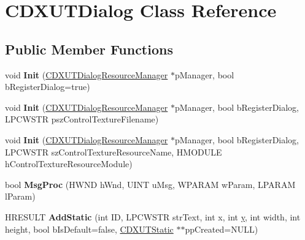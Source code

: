 \hypertarget{class_c_d_x_u_t_dialog}{\section{C\+D\+X\+U\+T\+Dialog Class Reference}
\label{class_c_d_x_u_t_dialog}
}
\subsection*{Public Member Functions}
\begin{DoxyCompactItemize}
\item 
\hypertarget{class_c_d_x_u_t_dialog_a45fcf9a802d8a9f1bce9bded09c58e22}{void {\bfseries Init} (\hyperlink{class_c_d_x_u_t_dialog_resource_manager}{C\+D\+X\+U\+T\+Dialog\+Resource\+Manager} $\ast$p\+Manager, bool b\+Register\+Dialog=true)}\label{class_c_d_x_u_t_dialog_a45fcf9a802d8a9f1bce9bded09c58e22}

\item 
\hypertarget{class_c_d_x_u_t_dialog_a50607e82b3211003dfaf0daf79aa0719}{void {\bfseries Init} (\hyperlink{class_c_d_x_u_t_dialog_resource_manager}{C\+D\+X\+U\+T\+Dialog\+Resource\+Manager} $\ast$p\+Manager, bool b\+Register\+Dialog, L\+P\+C\+W\+S\+T\+R psz\+Control\+Texture\+Filename)}\label{class_c_d_x_u_t_dialog_a50607e82b3211003dfaf0daf79aa0719}

\item 
\hypertarget{class_c_d_x_u_t_dialog_aa1de5939c452894caa2602505aa77e72}{void {\bfseries Init} (\hyperlink{class_c_d_x_u_t_dialog_resource_manager}{C\+D\+X\+U\+T\+Dialog\+Resource\+Manager} $\ast$p\+Manager, bool b\+Register\+Dialog, L\+P\+C\+W\+S\+T\+R sz\+Control\+Texture\+Resource\+Name, H\+M\+O\+D\+U\+L\+E h\+Control\+Texture\+Resource\+Module)}\label{class_c_d_x_u_t_dialog_aa1de5939c452894caa2602505aa77e72}

\item 
\hypertarget{class_c_d_x_u_t_dialog_abb1e03c6d2da865384e34a6a60a41be4}{bool {\bfseries Msg\+Proc} (H\+W\+N\+D h\+Wnd, U\+I\+N\+T u\+Msg, W\+P\+A\+R\+A\+M w\+Param, L\+P\+A\+R\+A\+M l\+Param)}\label{class_c_d_x_u_t_dialog_abb1e03c6d2da865384e34a6a60a41be4}

\item 
\hypertarget{class_c_d_x_u_t_dialog_afe893ab17f6905d1908e6fd1499749b1}{H\+R\+E\+S\+U\+L\+T {\bfseries Add\+Static} (int I\+D, L\+P\+C\+W\+S\+T\+R str\+Text, int x, int \hyperlink{_ice_utils_8h_aa7ffaed69623192258fb8679569ff9ba}{y}, int width, int height, bool b\+Is\+Default=false, \hyperlink{class_c_d_x_u_t_static}{C\+D\+X\+U\+T\+Static} $\ast$$\ast$pp\+Created=N\+U\+L\+L)}\label{class_c_d_x_u_t_dialog_afe893ab17f6905d1908e6fd1499749b1}


\end{DoxyCompactItemize}
